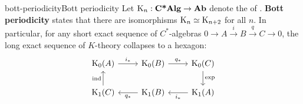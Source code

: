 \begin{topic}{bott-periodicity}{Bott periodicity}
    Let $\textup{K}_n : \textbf{C*Alg} \to \textbf{Ab}$ denote the  of . \textbf{Bott periodicity} states that there are isomorphisms $\textup{K}_n \simeq \textup{K}_{n + 2}$ for all $n$. In particular, for any short exact sequence of $C^*$-algebras $0 \to A \xrightarrow{i} B \xrightarrow{q} C \to 0$, the long exact sequence of $K$-theory collapses to a hexagon:
    \[ \begin{tikzcd}
        \textup{K}_0(A) \arrow{r}{i_*} & \textup{K}_0(B) \arrow{r}{q_*} & \textup{K}_0(C) \arrow{d}{\exp} \\ \textup{K}_1(C) \arrow{u}{\textup{ind}} & \textup{K}_1(B) \arrow{l}{q_*} & \textup{K}_1(A) \arrow{l}{i_*}
    \end{tikzcd} \]
\end{topic}
